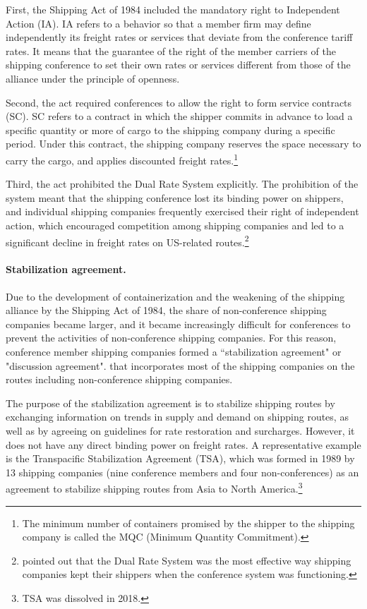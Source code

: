 \documentclass[11pt]{article}
\begin{document}
First, the Shipping Act of 1984 included the mandatory right to Independent Action (IA). IA refers to a behavior so that a member firm may define independently its freight rates or services that deviate from the conference tariff rates. It means that the guarantee of the right of the member carriers of the shipping conference to set their own rates or services different from those of the alliance under the principle of openness.

Second, the act required conferences to allow the right to form service contracts (SC). SC refers to a contract in which the shipper commits in advance to load a specific quantity or more of cargo to the shipping company during a specific period. Under this contract, the shipping company reserves the space necessary to carry the cargo, and applies discounted freight rates.\footnote{The minimum number of containers promised by the shipper to the shipping company is called the MQC (Minimum Quantity Commitment).}

Third, the act prohibited the Dual Rate System explicitly. The prohibition of the system meant that the shipping conference lost its binding power on shippers, and individual shipping companies frequently exercised their right of independent action, which encouraged competition among shipping companies and led to a significant decline in freight rates on US-related routes.\footnote{\cite{JMC2008} pointed out that the Dual Rate System was the most effective way shipping companies kept their shippers when the conference system was functioning.}  

\paragraph{Stabilization agreement.}
Due to the development of containerization and the weakening of the shipping alliance by the Shipping Act of 1984, the share of non-conference shipping companies became larger, and it became increasingly difficult for conferences to prevent the activities of non-conference shipping companies. For this reason, conference member shipping companies formed a ``stabilization agreement" or "discussion agreement". that incorporates most of the shipping companies on the routes including non-conference shipping companies. 

The purpose of the stabilization agreement is to stabilize shipping routes by exchanging information on trends in supply and demand on shipping routes, as well as by agreeing on guidelines for rate restoration and surcharges. However, it does not have any direct binding power on freight rates. A representative example is the Transpacific Stabilization Agreement (TSA), which was formed in 1989 by 13 shipping companies (nine conference members and four non-conferences) as an agreement to stabilize shipping routes from Asia to North America.\footnote{TSA was dissolved in 2018. } 
\end{document}
